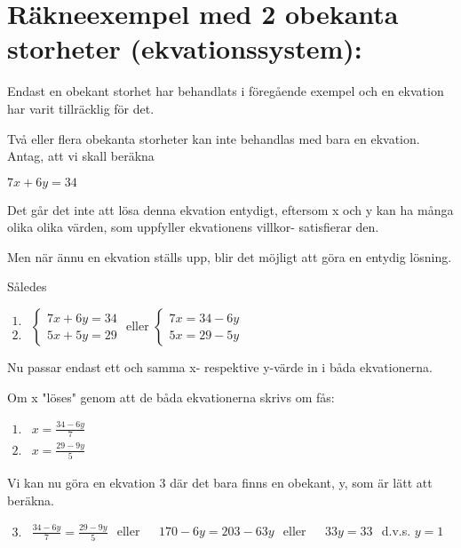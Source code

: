 \section{Räkneexempel med 2 obekanta storheter
(ekvationssystem):}

Endast en obekant storhet har behandlats i föregående exempel och en ekvation
har varit tillräcklig för det.

Två eller flera obekanta storheter kan inte behandlas med bara en ekvation.
Antag, att vi skall beräkna

$7x+6y=34$

Det går det inte att lösa denna ekvation entydigt, eftersom x och y kan ha många
olika olika värden, som uppfyller ekvationens villkor- satisfierar den.

Men när ännu en ekvation ställs upp, blir det möjligt att göra en entydig
lösning.

Således

$
\begin{array}{c}
1.\\2.
\end{array}
$ $
\left\{
\begin{array}{l}
7x + 6y = 34\\
5x + 5y = 29
\end{array}
\right.
$ eller $
\left\{
\begin{array}{l}
7x = 34 - 6y\\
5x = 29 - 5y 
\end{array}
\right. 
$

Nu passar endast ett och samma x- respektive y-värde in i båda ekvationerna.

Om x "löses" genom att de båda ekvationerna skrivs om fås:

$
\begin{array}{ll}
1. & x = \frac{34-6y}{7}\\
2. & x = \frac{29-9y}{5}
\end{array}
$

Vi kan nu göra en ekvation 3 där det bara finns en obekant, y, som är lätt
att beräkna.

$
\begin{array}{ll}
3. & \frac{34 - 6y}{7} = \frac{29 - 9y}{5}
\end{array}
$ eller
$
\begin{array}{ll}
 & 170 - 6y = 203-63y
\end{array}
$ eller
$
\begin{array}{ll}
 & 33y = 33
\end{array}
$ d.v.s. $y = 1$

